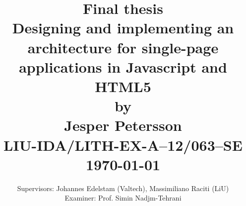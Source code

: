 \title{
	Final thesis \\
	\vspace{2.5cm}
	\textbf{Designing and implementing an architecture for single-page applications in Javascript and HTML5} \\
	\vspace{0.5cm}
	by \\
	\vspace{0.5cm}
	\textbf{Jesper Petersson} \\
	\vspace{2.5cm}
	LIU-IDA/LITH-EX-A--12/063--SE \\
	\vspace{0.5cm}
	\today \\
}

\date{
	Supervisors: Johannes Edelstam (Valtech), Massimiliano Raciti (LiU) \\
	\vspace{0.5cm}
	Examiner: Prof. Simin Nadjm-Tehrani
}

\maketitle
